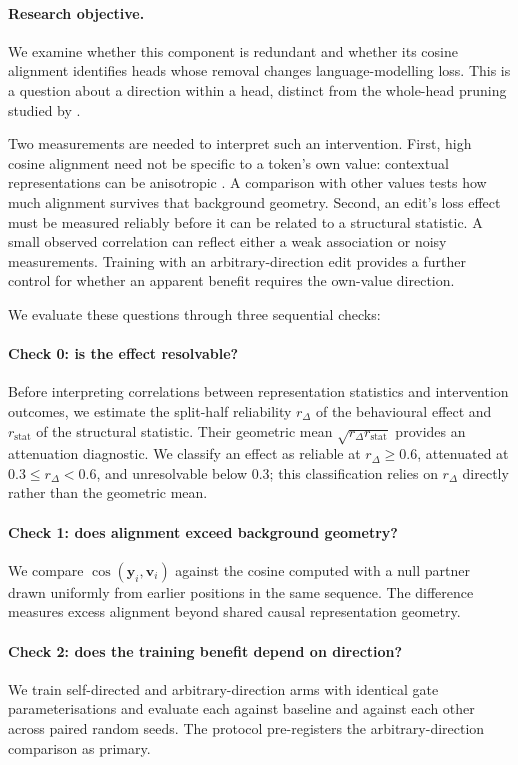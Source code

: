 \documentclass{article} %
\newcommand{\yv}{\mathbf{y}}
\begin{document}
\paragraph{Research objective.}
We examine whether this component is redundant and whether its cosine
alignment identifies heads whose removal changes language-modelling loss.
This is a question about a direction within a head, distinct from the
whole-head pruning studied by \citet{michel2019sixteen,voita2019analyzing}.

Two measurements are needed to interpret such an intervention. First, high
cosine alignment need not be specific to a token's own value:
contextual representations can be anisotropic \citep{ethayarajh2019contextual}.
A comparison with other values tests how much alignment survives that
background geometry. Second, an edit's loss effect must be measured
reliably before it can be related to a structural statistic. A small observed
correlation can reflect either a weak association or noisy measurements.
Training with an arbitrary-direction edit provides a further control for
whether an apparent benefit requires the own-value direction.

We evaluate these questions through three sequential checks:

\paragraph{Check 0: is the effect resolvable?} Before interpreting correlations
between representation statistics and intervention outcomes, we estimate the
split-half reliability $r_\Delta$ of the behavioural effect and $r_{\text{stat}}$
of the structural statistic. Their geometric mean $\sqrt{r_\Delta r_{\text{stat}}}$
provides an attenuation diagnostic. We classify an effect as reliable at
$r_\Delta \ge 0.6$, attenuated at $0.3 \le r_\Delta < 0.6$, and unresolvable below
$0.3$; this classification relies on $r_\Delta$ directly rather than the geometric mean.

\paragraph{Check 1: does alignment exceed background geometry?} We compare
$\cos(\yv_i, \mathbf{v}_i)$ against the cosine computed with a null partner drawn
uniformly from earlier positions in the same sequence. The difference measures
excess alignment beyond shared causal representation geometry.

\paragraph{Check 2: does the training benefit depend on direction?} We train
self-directed and arbitrary-direction arms with identical gate parameterisations
and evaluate each against baseline and against each other across paired random seeds.
The protocol pre-registers the arbitrary-direction comparison as primary.
\end{document}
